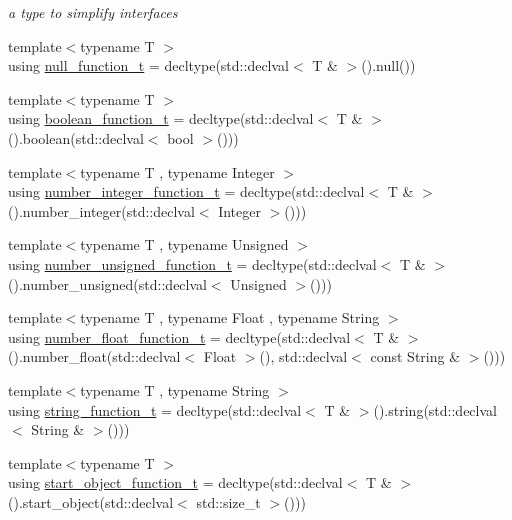 \begin{DoxyCompactItemize}
\begin{DoxyCompactList}\small\item\em a type to simplify interfaces \end{DoxyCompactList}\item 
{\footnotesize template$<$typename T $>$ }\\using \mbox{\hyperlink{namespacenlohmann_1_1detail_ac1b4e524746bf8b790b2b776048b93c4}{null\+\_\+function\+\_\+t}} = decltype(std\+::declval$<$ T \& $>$().null())
\item 
{\footnotesize template$<$typename T $>$ }\\using \mbox{\hyperlink{namespacenlohmann_1_1detail_a45ec87326503b8884b664a9ef23a6c99}{boolean\+\_\+function\+\_\+t}} = decltype(std\+::declval$<$ T \& $>$().boolean(std\+::declval$<$ bool $>$()))
\item 
{\footnotesize template$<$typename T , typename Integer $>$ }\\using \mbox{\hyperlink{namespacenlohmann_1_1detail_a4a3e14a011b9ea1ff849fc6d2411e6a0}{number\+\_\+integer\+\_\+function\+\_\+t}} = decltype(std\+::declval$<$ T \& $>$().number\+\_\+integer(std\+::declval$<$ Integer $>$()))
\item 
{\footnotesize template$<$typename T , typename Unsigned $>$ }\\using \mbox{\hyperlink{namespacenlohmann_1_1detail_a74da7b17bda76f65d276feb18209c913}{number\+\_\+unsigned\+\_\+function\+\_\+t}} = decltype(std\+::declval$<$ T \& $>$().number\+\_\+unsigned(std\+::declval$<$ Unsigned $>$()))
\item 
{\footnotesize template$<$typename T , typename Float , typename String $>$ }\\using \mbox{\hyperlink{namespacenlohmann_1_1detail_ad42df56e913abe26ed556e0e92f386f4}{number\+\_\+float\+\_\+function\+\_\+t}} = decltype(std\+::declval$<$ T \& $>$().number\+\_\+float(std\+::declval$<$ Float $>$(), std\+::declval$<$ const String \& $>$()))
\item 
{\footnotesize template$<$typename T , typename String $>$ }\\using \mbox{\hyperlink{namespacenlohmann_1_1detail_a27c3fc3bd42ac406f763184aa8ae4cb0}{string\+\_\+function\+\_\+t}} = decltype(std\+::declval$<$ T \& $>$().string(std\+::declval$<$ String \& $>$()))
\item 
{\footnotesize template$<$typename T $>$ }\\using \mbox{\hyperlink{namespacenlohmann_1_1detail_a5fff1e6dcaabd367d9b1109a5682f9d4}{start\+\_\+object\+\_\+function\+\_\+t}} = decltype(std\+::declval$<$ T \& $>$().start\+\_\+object(std\+::declval$<$ std\+::size\+\_\+t $>$()))

\end{DoxyCompactItemize}
